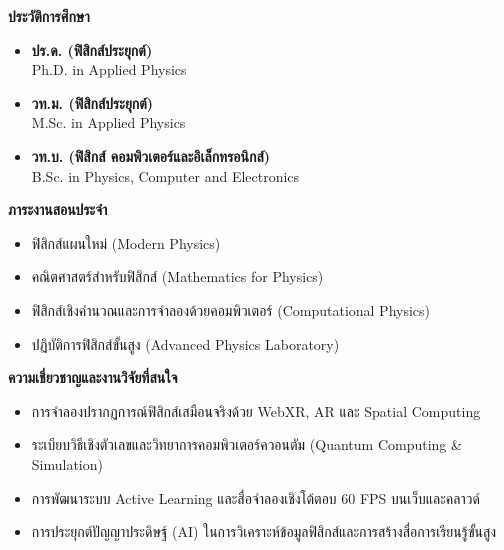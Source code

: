 \noindent
\begin{minipage}[t]{0.48\textwidth}
    {\fontsize{12}{15}\selectfont\bfseries\color{cyberBlue} ประวัติการศึกษา}\par\vspace{2pt}
    \begin{itemize}\setlength{\itemsep}{1pt}\setlength{\parsep}{0pt}\setlength{\topsep}{1pt}\setlength{\partopsep}{0pt}\setlength{\leftmargin}{12pt}
        \item \textbf{ปร.ด. (ฟิสิกส์ประยุกต์)}\\Ph.D. in Applied Physics
        \item \textbf{วท.ม. (ฟิสิกส์ประยุกต์)}\\M.Sc. in Applied Physics
        \item \textbf{วท.บ. (ฟิสิกส์ คอมพิวเตอร์และอิเล็กทรอนิกส์)}\\B.Sc. in Physics, Computer and Electronics
    \end{itemize}

    \vspace{0.2cm}
    {\fontsize{12}{15}\selectfont\bfseries\color{cyberBlue} ภาระงานสอนประจำ}\par\vspace{2pt}
    \begin{itemize}\setlength{\itemsep}{1pt}\setlength{\parsep}{0pt}\setlength{\topsep}{1pt}\setlength{\partopsep}{0pt}\setlength{\leftmargin}{12pt}
        \item ฟิสิกส์แผนใหม่ (Modern Physics)
        \item คณิตศาสตร์สำหรับฟิสิกส์ (Mathematics for Physics)
        \item ฟิสิกส์เชิงคำนวณและการจำลองด้วยคอมพิวเตอร์ (Computational Physics)
        \item ปฏิบัติการฟิสิกส์ขั้นสูง (Advanced Physics Laboratory)
    \end{itemize}
\end{minipage}\hfill
\begin{minipage}[t]{0.49\textwidth}
    {\fontsize{12}{15}\selectfont\bfseries\color{neonPurple} ความเชี่ยวชาญและงานวิจัยที่สนใจ}\par\vspace{2pt}
    \begin{itemize}\setlength{\itemsep}{2pt}\setlength{\parsep}{0pt}\setlength{\topsep}{1pt}\setlength{\partopsep}{0pt}\setlength{\leftmargin}{12pt}
        \item การจำลองปรากฏการณ์ฟิสิกส์เสมือนจริงด้วย WebXR, AR และ Spatial Computing
        \item ระเบียบวิธีเชิงตัวเลขและวิทยาการคอมพิวเตอร์ควอนตัม (Quantum Computing \& Simulation)
        \item การพัฒนาระบบ Active Learning และสื่อจำลองเชิงโต้ตอบ 60 FPS บนเว็บและคลาวด์
        \item การประยุกต์ปัญญาประดิษฐ์ (AI) ในการวิเคราะห์ข้อมูลฟิสิกส์และการสร้างสื่อการเรียนรู้ขั้นสูง
    \end{itemize}
\end{minipage}

